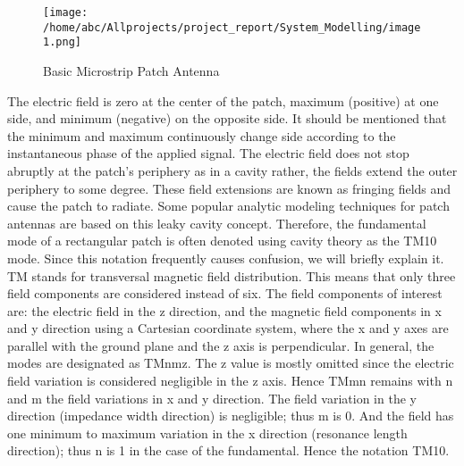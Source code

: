 \documentclass[12pt]{article}
\begin{document}
		   \begin{figure}[h]
		   	\centering
			 \texttt{[image: /home/abc/Allprojects/project\_report/System\_Modelling/image1.png]}
			 \caption{Basic Microstrip Patch Antenna}
		   \end{figure}
	   
	  \justify
	   The electric field is zero at the center of the patch, maximum (positive) at one side, and minimum (negative) on the opposite side. It should be mentioned that the minimum and maximum continuously change side according to the instantaneous phase of the applied signal. The electric field does not stop abruptly at the patch's periphery as in a cavity rather, the fields extend the outer periphery to some degree. These field extensions are known as fringing fields and cause the patch to radiate. Some popular analytic modeling techniques for patch antennas are based on this leaky cavity concept. Therefore, the fundamental mode of a rectangular patch is often denoted using cavity theory as the TM10 mode.
	 \justify
	   Since this notation frequently causes confusion, we will briefly explain it. TM stands for transversal  magnetic field distribution. This means that only three field components are considered instead of six. The field components of interest are: the electric field in the z direction, and the magnetic field components in x and y direction using a Cartesian coordinate system, where the x and y axes are parallel with the ground plane and the z axis is perpendicular. In general, the modes are designated as TMnmz. The z value is mostly omitted since the electric field variation is considered negligible in the z axis. Hence TMmn remains with n and m the field variations in x and y direction. The field variation in the y direction (impedance width direction) is negligible; thus m is 0. And the field has one minimum to maximum variation in the x direction (resonance length direction); thus n is 1 in the case of the fundamental. Hence the notation TM10.
\end{document}
